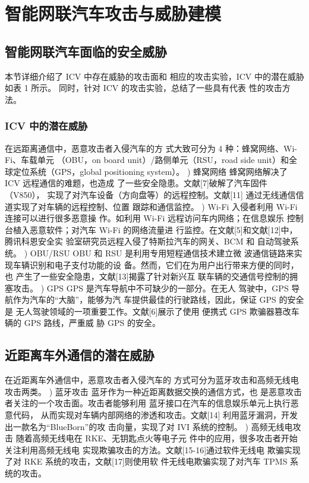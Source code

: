 \chapter{智能网联汽车攻击与威胁建模}
\label{ch3}

\section{智能网联汽车面临的安全威胁}
本节详细介绍了 ICV 中存在威胁的攻击面和
相应的攻击实验，ICV 中的潜在威胁如表 1 所示。
同时，针对 ICV 的攻击实验，总结了一些具有代表
性的攻击方法。
\subsection[]{ICV 中的潜在威胁}
在远距离通信中，恶意攻击者入侵汽车的方
式大致可分为 4 种：蜂窝网络、Wi-Fi、车载单元
（OBU，on board unit）/路侧单元（RSU，road side
unit）和全球定位系统（GPS，global positioning
system）。
) 蜂窝网络
蜂窝网络解决了 ICV 远程通信的难题，也造成
了一些安全隐患。文献[7]破解了汽车固件（V850），
实现了对汽车设备（方向盘等）的远程控制。文献[11]
通过无线通信信道实现了对车辆的远程控制、位置
跟踪和通信监控。
) Wi-Fi
入侵者利用 Wi-Fi 连接可以进行很多恶意操
作。如利用 Wi-Fi 远程访问车内网络；在信息娱乐
控制台植入恶意软件；对汽车 Wi-Fi 的网络流量进
行监控。在文献[5]和文献[12]中，腾讯科恩安全实
验室研究员远程入侵了特斯拉汽车的网关、BCM 和
自动驾驶系统。
) OBU/RSU
OBU 和 RSU 是利用专用短程通信技术建立微
波通信链路来实现车辆识别和电子支付功能的设
备。然而，它们在为用户出行带来方便的同时，也
产生了一些安全隐患，文献[13]揭露了针对新兴互
联车辆的交通信号控制的拥塞攻击。
) GPS
GPS 是汽车导航中不可缺少的一部分。在无人
驾驶中，GPS 导航作为汽车的“大脑”，能够为汽
车提供最佳的行驶路线，因此，保证 GPS 的安全是
无人驾驶领域的一项重要工作。文献[6]展示了使用
便携式 GPS 欺骗器篡改车辆的 GPS 路线，严重威
胁 GPS 的安全。
\section{近距离车外通信的潜在威胁}
在近距离车外通信中，恶意攻击者入侵汽车的
方式可分为蓝牙攻击和高频无线电攻击两类。
) 蓝牙攻击
蓝牙作为一种近距离数据交换的通信方式，也
是恶意攻击者关注的一个攻击面。攻击者能够利用
蓝牙接口在汽车的信息娱乐单元上执行恶意代码，
从而实现对车辆内部网络的渗透和攻击。文献[14]
利用蓝牙漏洞，开发出一款名为“BlueBorn”的攻
击向量，实现了对 IVI 系统的控制。
) 高频无线电攻击
随着高频无线电在 RKE、无钥匙点火等电子元
件中的应用，很多攻击者开始关注利用高频无线电
实现欺骗攻击的方法。文献[15-16]通过软件无线电
欺骗实现了对 RKE 系统的攻击，文献[17]则使用软
件无线电欺骗实现了对汽车 TPMS 系统的攻击。

